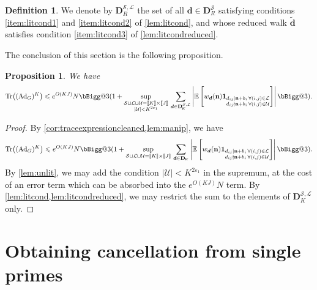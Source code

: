 \documentclass[11pt]{amsart}
\makeatletter
\newtheorem{proposition}[theorem]{Proposition}
\theoremstyle{definition}
\newtheorem{definition}[theorem]{Definition}
\renewcommand{\leq}{\leqslant}
\newcommand{\sinterval}[1]{[\![#1]\!] }
\newcommand{\abs}[1]{\left|#1\right|}
\newcommand{\ind}[1]{\mathbf{1}_{#1}}
\newcommand{\eps}{\varepsilon}
\newcommand{\E}{\mathbb{E}}
\newcommand{\Ad}{\mathrm{Ad}}
\newcommand{\Tr}{\mathrm{Tr}}
\renewcommand{\d}{\boldsymbol{d}}
\newcommand{\pcomp}[2]{d_{#1#2}}
\newcommand{\n}{\mathbf{n}}
\newcommand{\cstU}{2\eps_1}
\newcommand{\graph}{G}
\newcommand{\sommespart}{b}
\newcommand{\lit}{\mathcal{L}}
\newcommand{\unlit}{\mathcal{U}}
\newcommand{\s}{\mathcal{S}}
\newcommand{\fancyD}{\mathbf{D}}
\newcommand{\Dsf}{\fancyD_{\!\repK}}
\newcommand{\Dss}{\fancyD^{\s,\lit}_{\!\repK}}
\newcommand{\DsR}{\fancyD^{\s}_{\!\tupsize}}
\newcommand{\DssR}{\fancyD^{\s,\lit}_{\!\tupsize}}
\newcommand{\repR}{J}
\newcommand{\repK}{K}
\newcommand{\newK}{\sinterval{K}}
\newcommand{\newR}{\sinterval{J}}
\newcommand{\Redd}{\widetilde{\d}}
\newcommand{\newerKR}{\newK\times\newR}
\newcommand{\tupsize}{R}
\newcommand{\vast}{\bBigg@{3}}
\makeatother
\begin{document}
\begin{definition}
\label{def:Dss}
We denote by $\DssR$ the set of all $\d\in\DsR$ satisfying conditions \cref{item:litcond1} and \cref{item:litcond2} of \cref{lem:litcond}, and whose reduced walk $\Redd$ satisfies condition \cref{item:litcond3} of \cref{lem:litcondreduced}.
\end{definition}


The conclusion of this section is the following proposition.

\begin{proposition}
\label{lem:summaryfourlemmas}
We have
\begin{equation*}
	\Tr \big((\Ad_{\graph})^{\repK}\big) \leq e^{O(\repK\repR)}N \vast( 1+ \sup_{\substack{\s\sqcup \lit\sqcup \unlit = \newerKR\\ |\unlit| <\repK^{\cstU}}}\, \sum_{\d\in \Dss}\abs{ \E \left[w_{\d}(\n) \ind{\substack{\pcomp{i}{j}\mid \n+\sommespart_i \, \forall (i,j)\in \lit \\ \pcomp{i}{j}\nmid \n+\sommespart_i \, \forall (i,j)\in \unlit}} \right] }\vast).
\end{equation*}
\end{proposition}
\begin{proof}
By  \cref{cor:traceexpressioncleaned,lem:manip}, we have
\begin{equation*}
	\Tr \big((\Ad_{\graph})^{\repK}\big) \leq e^{O(\repK\repR)}N \vast( 1+ \sup_{\substack{\s\sqcup \lit\sqcup \unlit = \newerKR}}\, \sum_{\d\in \Dsf}\abs{ \E \left[w_{\d}(\n) \ind{\substack{\pcomp{i}{j}\mid \n+\sommespart_i \, \forall (i,j)\in \lit \\ \pcomp{i}{j}\nmid \n+\sommespart_i \, \forall (i,j)\in \unlit}} \right] }\vast).
\end{equation*}
By \cref{lem:unlit}, we may add the condition $|\unlit| <\repK^{\cstU}$ in the supremum, at the cost of an error term which can be absorbed into the $e^{O(KJ)} N$ term. By \cref{lem:litcond,lem:litcondreduced}, we may restrict the sum to the elements of $\Dss$ only.
\end{proof}











\section{Obtaining cancellation from single primes}
\label{sec:lone}
\end{document}
